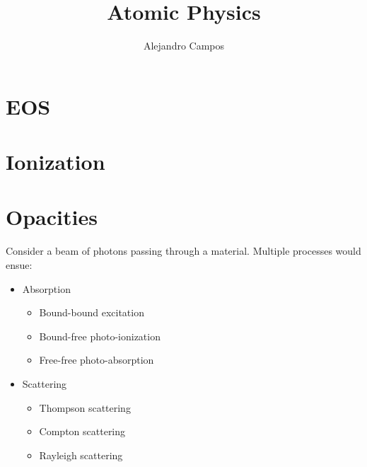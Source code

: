 \documentclass[a4paper,11pt]{report}
\title{Atomic Physics}
\author{Alejandro Campos}
\begin{document}
\maketitle
\tableofcontents

\chapter{EOS}

\chapter{Ionization}

\chapter{Opacities}
Consider a beam of photons passing through a material. Multiple processes would ensue:
\begin{itemize}
    \item Absorption
    \begin{itemize}
        \item Bound-bound excitation
        \item Bound-free photo-ionization
        \item Free-free photo-absorption
    \end{itemize}
    \item Scattering
    \begin{itemize}
        \item Thompson scattering
        \item Compton scattering
        \item Rayleigh scattering
    \end{itemize}
\end{itemize}
\end{document}
